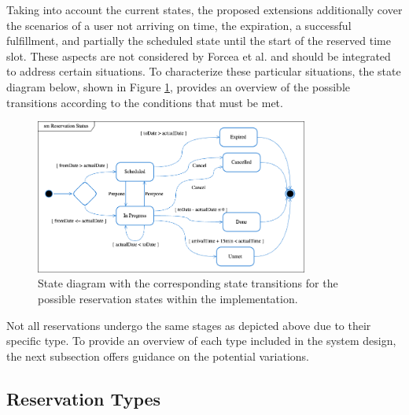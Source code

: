 \noindent Taking into account the current states, the proposed extensions additionally cover the scenarios of a user not arriving on time, the expiration, a successful fulfillment, and partially the scheduled state until the start of the reserved time slot.
These aspects are not considered by Forcea et al. and should be integrated to address certain situations.
To characterize these particular situations, the state diagram below, shown in Figure \ref{fig:reservation-states}, provides an overview of the possible transitions according to the conditions that must be met.

\begin{figure}[h]
    \centering
    \includegraphics[width=0.8\textwidth,keepaspectratio]{resources/images/main/5_design/ReservationStatusStates.png}
    \caption{State diagram with the corresponding state transitions for the possible reservation states within the implementation.}
    \label{fig:reservation-states}
\end{figure}

\noindent Not all reservations undergo the same stages as depicted above due to their specific type. To provide an overview of each type included in the system design, the next subsection offers guidance on the potential variations.

\newpage

\subsection{Reservation Types}
\label{ch:Design:sec:Reservation:ssec:Reservation Types}

